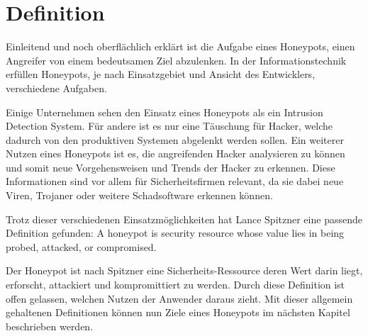 \section{Definition}

Einleitend und noch oberflächlich erklärt ist die Aufgabe eines Honeypots, einen Angreifer von einem bedeutsamen Ziel abzulenken. In der Informationstechnik erfüllen Honeypots, je nach Einsatzgebiet und Ansicht des Entwicklers, verschiedene Aufgaben.

Einige Unternehmen sehen den Einsatz eines Honeypots als ein Intrusion Detection System. Für andere ist es nur eine Täuschung für Hacker, welche dadurch von den produktiven Systemen abgelenkt werden sollen. Ein weiterer Nutzen eines Honeypots ist es, die angreifenden Hacker analysieren zu können und somit neue Vorgehensweisen und Trends der Hacker zu erkennen. Diese Informationen sind vor allem für Sicherheitsfirmen relevant, da sie dabei neue Viren, Trojaner oder weitere Schadsoftware erkennen können.

Trotz dieser verschiedenen Einsatzmöglichkeiten hat Lance Spitzner eine passende Definition gefunden: \glqq A honeypot is security resource whose value lies in being probed, attacked, or compromised.\grqq \cite{ebner.2006a}

Der Honeypot ist nach Spitzner eine Sicherheits-Ressource deren Wert darin liegt, erforscht, attackiert und kompromittiert zu werden. Durch diese Definition ist offen gelassen, welchen Nutzen der Anwender daraus zieht. Mit dieser allgemein gehaltenen Definitionen können nun Ziele eines Honeypots im nächsten Kapitel beschrieben werden.
